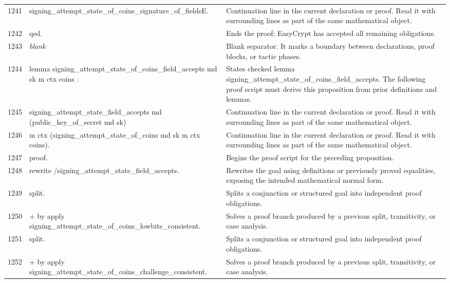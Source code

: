 \documentclass[10pt]{article}
\begin{document}
\begin{longtable}{r L{0.53\textwidth} L{0.37\textwidth}}
1241 & {\ttfamily\scriptsize            signing\_attempt\_state\_of\_coins\_signature\_of\_fieldsE.} & Continuation line in the current declaration or proof.  Read it with surrounding lines as part of the same mathematical object. \\
1242 & {\ttfamily\scriptsize qed.} & Ends the proof; EasyCrypt has accepted all remaining obligations. \\
1243 & {\ttfamily\scriptsize \emph{blank}} & Blank separator.  It marks a boundary between declarations, proof blocks, or tactic phases. \\
1244 & {\ttfamily\scriptsize lemma signing\_attempt\_state\_of\_coins\_field\_accepts md sk m ctx coins :} & States checked lemma signing\_attempt\_state\_of\_coins\_field\_accepts.  The following proof script must derive this proposition from prior definitions and lemmas. \\
1245 & {\ttfamily\scriptsize   signing\_attempt\_state\_field\_accepts md (public\_key\_of\_secret md sk)} & Continuation line in the current declaration or proof.  Read it with surrounding lines as part of the same mathematical object. \\
1246 & {\ttfamily\scriptsize     m ctx (signing\_attempt\_state\_of\_coins md sk m ctx coins).} & Continuation line in the current declaration or proof.  Read it with surrounding lines as part of the same mathematical object. \\
1247 & {\ttfamily\scriptsize proof.} & Begins the proof script for the preceding proposition. \\
1248 & {\ttfamily\scriptsize rewrite /signing\_attempt\_state\_field\_accepts.} & Rewrites the goal using definitions or previously proved equalities, exposing the intended mathematical normal form. \\
1249 & {\ttfamily\scriptsize split.} & Splits a conjunction or structured goal into independent proof obligations. \\
1250 & {\ttfamily\scriptsize + by apply signing\_attempt\_state\_of\_coins\_lowbits\_consistent.} & Solves a proof branch produced by a previous split, transitivity, or case analysis. \\
1251 & {\ttfamily\scriptsize split.} & Splits a conjunction or structured goal into independent proof obligations. \\
1252 & {\ttfamily\scriptsize + by apply signing\_attempt\_state\_of\_coins\_challenge\_consistent.} & Solves a proof branch produced by a previous split, transitivity, or case analysis. \\

\end{longtable}
\end{document}

